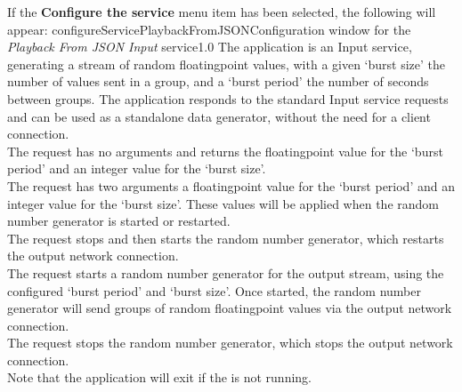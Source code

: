 If the \textbf{Configure the service} menu item has been selected, the following will
appear:
%
{configureServicePlaybackFromJSON}{Configuration window for the \emph{Playback From JSON
Input} service}{1.0}
The  application is an Input service,
generating a stream of random floating\longDash{}point values, with a given `burst size'
\longDash{} the number of values sent in a group, and a `burst period' \longDash{} the
number of seconds between groups.
The application responds to the standard Input service requests and can be used as a
standalone data generator, without the need for a client connection.\\

The  request has no arguments and
returns the floating\longDash{}point value for the `burst period' and an integer value for
the `burst size'.\\

The  request has two arguments
\longDash{} a floating\longDash{}point value for the `burst period' and an integer value
for the `burst size'.
These values will be applied when the random number generator is started or restarted.\\

The  request stops and then
starts the random number generator, which restarts the output \yarp{} network
connection.\\

The  request starts a random
number generator for the output stream, using the configured `burst period' and
`burst size'.
Once started, the random number generator will send groups of random
floating\longDash{}point values via the output \yarp{} network connection.\\

The  request stops the random
number generator, which stops the output \yarp{} network connection.\\ 

Note that the application will exit if the  is not
running.\\

